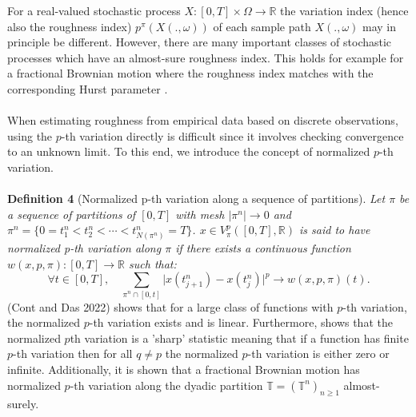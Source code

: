 \documentclass{article}
\begin{document}
For a real-valued stochastic process $X: [0,T]\times \Omega \rightarrow \mathbb{R}$ the variation index (hence also the roughness index) $p^\pi (X(.,\omega))$ of each sample path $X(.,\omega)$ may in principle be different. However, there are many important classes of stochastic processes which have an almost-sure roughness index. This holds for example for a fractional Brownian motion where the roughness index matches with the corresponding Hurst parameter \cite{cont}.\\\\
When estimating roughness from empirical data based on discrete observations, using the $p$-th variation directly is difficult since it involves checking convergence to an unknown limit. To this end, we introduce the concept of normalized $p$-th variation.\\\\
\textbf{Definition 4} (Normalized p-th variation along a sequence of partitions). 
\textit{Let $\pi$ be a sequence of partitions of $[0, T]$ with mesh $\lvert \pi^n \rvert \to 0$ and 
$\pi^n = \{ 0 = t_1^n < t_2^n < \cdots < t_{N(\pi^n)}^n = T \}$. 
$x \in V_{\pi}^p([0, T], \mathbb{R})$ is said to have normalized p-th variation along $\pi$ 
if there exists a continuous function $w(x, p, \pi) : [0, T] \to \mathbb{R}$ such that:}
\[
\forall t \in [0, T], \quad \sum_{\pi^n \cap [0,t]} \lvert x(t_{j+1}^n) - x(t_j^n) \rvert^p \to w(x, p, \pi)(t).
\]
(Cont and Das 2022) shows that for a large class of functions with $p$-th variation, the normalized $p$-th variation exists and is linear. Furthermore, \cite{cont} shows that the normalized $p$th variation is a 'sharp' statistic meaning that if a function has finite $p$-th variation then for all $q\neq p$ the normalized $p$-th variation is either zero or infinite. Additionally, it is shown that a fractional Brownian motion has normalized $p$-th variation along the dyadic partition $\mathbb{T}= (\mathbb{T}^n)_{n\geq 1}$ almost-surely.
\end{document}
